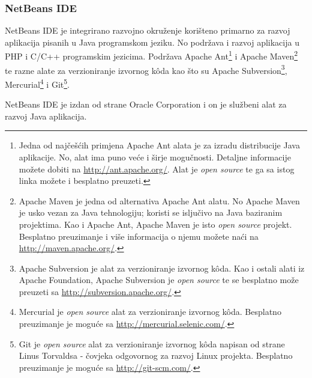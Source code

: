 \subsubsection{NetBeans IDE}
NetBeans IDE je integrirano razvojno okruženje korišteno primarno za razvoj aplikacija pisanih u Java programskom jeziku. No podržava i razvoj aplikacija u PHP i C/C++ programskim jezicima. Podržava Apache Ant\footnote{Jedna od najčešćih primjena Apache Ant alata je za izradu distribucije Java aplikacije. No, alat ima puno veće i širje mogučnosti. Detaljne informacije možete dobiti na \url{http://ant.apache.org/}. Alat je \emph{open source} te ga sa istog linka možete i besplatno preuzeti.} i Apache Maven\footnote{Apache Maven je jedna od alternativa Apache Ant alatu. No Apache Maven je usko vezan za Java tehnologiju; koristi se isljučivo na Java baziranim projektima. Kao i Apache Ant, Apache Maven je isto \emph{open source} projekt. Besplatno preuzimanje i više informacija o njemu možete naći na \url{http://maven.apache.org/}.} te razne alate za verzioniranje izvornog kôda kao što su Apache Subversion\footnote{Apache Subversion je alat za verzioniranje izvornog kôda. Kao i ostali alati iz Apache Foundation, Apache Subversion je \emph{open source} te se besplatno može preuzeti sa \url{http://subversion.apache.org/}.}, Mercurial\footnote{Mercurial je \emph{open source} alat za verzioniranje izvornog kôda. Besplatno preuzimanje je moguće sa \url{http://mercurial.selenic.com/}.} i Git\footnote{Git je \emph{open source} alat za verzioniranje izvornog kôda napisan od strane Linus Torvaldsa - čovjeka odgovornog za razvoj Linux projekta. Besplatno preuzimanje je moguće sa \url{http://git-scm.com/}.}.

\begin{infobox}
    NetBeans IDE je izdan od strane Oracle Corporation i on je službeni alat za razvoj Java aplikacija.
\end{infobox}

